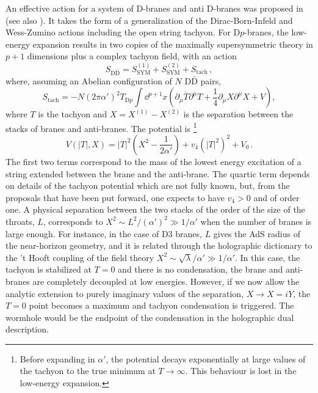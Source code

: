 An effective action for a system of D-branes and anti D-branes was proposed in \cite{Sen:2003tm,Garousi:2004rd} (see also \cite{Kraus:2000nj,Takayanagi:2000rz,Jones:2002sia,Jatkar:2000ei,Hikida:2000cp}).
It takes the form of a generalization of the Dirac-Born-Infeld and Wess-Zumino actions including the open string tachyon.
For D$p$-branes, the low-energy expansion results in two copies of the maximally supersymmetric theory in $p+1$ dimensions plus a complex tachyon field, with an action 
\begin{equation}
	S_{\text{D}\bar{\text{D}}}=S_{\text{SYM}}^{(1)}+S_{\text{SYM}}^{(2)}+S_{\text{tach}}\,,
\end{equation}
where, assuming an Abelian configuration of $N$ $\text{D}\bar{\text{D}}$ pairs,
\begin{equation}
	S_{\text{tach}}=-N(2\pi \alpha')^2T_{\text{D}p}\int \dd^{p+1}x \left(\partial_\mu\overline{T}\partial^\mu T+\frac{1}{4}\partial_\mu X\partial^\mu X+V\right),
\end{equation}
where $T$ is the tachyon and $X=X^{(1)}-X^{(2)}$ is the separation between the stacks of branes and anti-branes.
The potential is%
\footnote{Before expanding in $\alpha'$, the potential decays exponentially at large values of the tachyon to the true minimum at $T\to \infty$.
This behaviour is lost in the low-energy expansion.}
\begin{equation}
	V(|T|,X)=|T|^2\left( X^2-\frac{1}{2\alpha'}\right)+v_4 (|T|^2)^2+V_0\,.
\end{equation}
The first two terms correspond to the mass of the lowest energy excitation of a string extended between the brane and the anti-brane.
The quartic term depends on details of the tachyon potential which are not fully known, but, from the proposals that have been put forward, one expects to have $v_4>0$ and of order one.
A physical separation between the two stacks of the order of the size of the throats, $L$, corresponds to $X^2\sim L^2/(\alpha')^2\gg 1/\alpha'$ when the number of branes is large enough.
For instance, in the case of D3 branes, $L$ gives the AdS radius of the near-horizon geometry, and it is related through the holographic dictionary to the 't Hooft coupling of the field theory $X^2\sim \sqrt{\lambda}/\alpha'\gg 1/\alpha'$.
In this case, the tachyon is stabilized at $T=0$ and there is no condensation, the brane and anti-branes are completely decoupled at low energies.
However, if we now allow the analytic extension to purely imaginary values of the separation, $X\to X=i Y$, the $T=0$ point becomes a maximum and tachyon condensation is triggered.
The wormhole would be the endpoint of the condensation in the holographic dual description.

